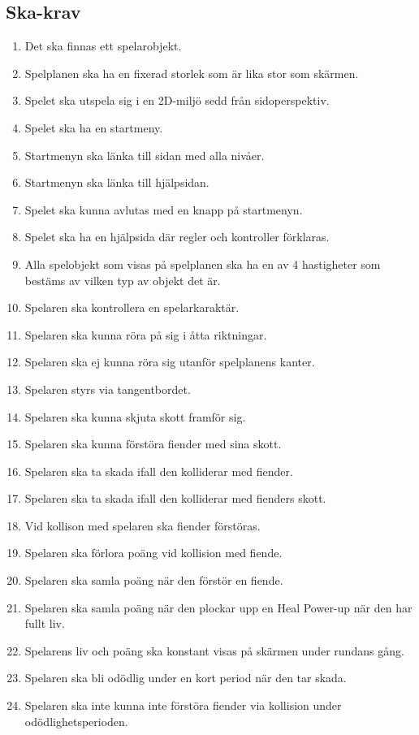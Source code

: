 \documentclass{TDP005mall}
\begin{document}
\subsection{Ska-krav}
\begin{enumerate}
\item Det ska finnas ett spelarobjekt.
\item Spelplanen ska ha en fixerad storlek som är lika stor som skärmen.
\item Spelet ska utspela sig i en 2D-miljö sedd från sidoperspektiv.
\item Spelet ska ha en startmeny.
\item Startmenyn ska länka till sidan med alla nivåer.
\item Startmenyn ska länka till hjälpsidan.
\item Spelet ska kunna avlutas med en knapp på startmenyn.
\item Spelet ska ha en hjälpsida där regler och kontroller förklaras.
\item Alla spelobjekt som visas på spelplanen ska ha en av 4 hastigheter som bestäms av vilken typ av objekt det är.
\item Spelaren ska kontrollera en spelarkaraktär.
\item Spelaren ska kunna röra på sig i åtta riktningar.
\item Spelaren ska ej kunna röra sig utanför spelplanens kanter.
\item Spelaren styrs via tangentbordet.
\item Spelaren ska kunna skjuta skott framför sig.
\item Spelaren ska kunna förstöra fiender med sina skott.
\item Spelaren ska ta skada ifall den kolliderar med fiender.
\item Spelaren ska ta skada ifall den kolliderar med fienders skott.
\item Vid kollison med spelaren ska fiender förstöras.
\item Spelaren ska förlora poäng vid kollision med fiende.
\item Spelaren ska samla poäng när den förstör en fiende.
\item Spelaren ska samla poäng när den plockar upp en Heal Power-up när den har fullt liv.
\item Spelarens liv och poäng ska konstant visas på skärmen under rundans gång.
\item Spelaren ska bli odödlig under en kort period när den tar skada.
\item Spelaren ska inte kunna inte förstöra fiender via kollision under odödlighetsperioden.

\end{enumerate}
\end{document}
